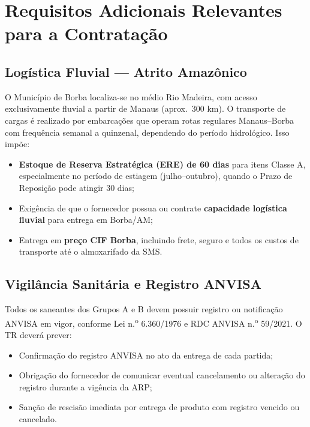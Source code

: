 \documentclass[12pt,a4paper]{article}
\begin{document}
\section{Requisitos Adicionais Relevantes para a Contratação}

\subsection{Logística Fluvial --- Atrito Amazônico}

O Município de Borba localiza-se no médio Rio Madeira, com acesso exclusivamente
fluvial a partir de Manaus (aprox.\ 300 km). O transporte de cargas é realizado por
embarcações que operam rotas regulares Manaus--Borba com frequência semanal a quinzenal,
dependendo do período hidrológico. Isso impõe:

\begin{itemize}
  \item \textbf{Estoque de Reserva Estratégica (ERE) de 60 dias} para itens Classe A,
    especialmente no período de estiagem (julho--outubro), quando o Prazo de Reposição
    pode atingir 30 dias;
  \item Exigência de que o fornecedor possua ou contrate \textbf{capacidade logística
    fluvial} para entrega em Borba/AM;
  \item Entrega em \textbf{preço CIF Borba}, incluindo frete, seguro e todos os custos
    de transporte até o almoxarifado da SMS.
\end{itemize}

\subsection{Vigilância Sanitária e Registro ANVISA}

Todos os saneantes dos Grupos A e B devem possuir registro ou notificação ANVISA em
vigor, conforme Lei n.\textsuperscript{o} 6.360/1976 e RDC ANVISA n.\textsuperscript{o}
59/2021. O TR deverá prever:

\begin{itemize}
  \item Confirmação do registro ANVISA no ato da entrega de cada partida;
  \item Obrigação do fornecedor de comunicar eventual cancelamento ou alteração do
    registro durante a vigência da ARP;
  \item Sanção de rescisão imediata por entrega de produto com registro vencido ou
    cancelado.
\end{itemize}
\end{document}
